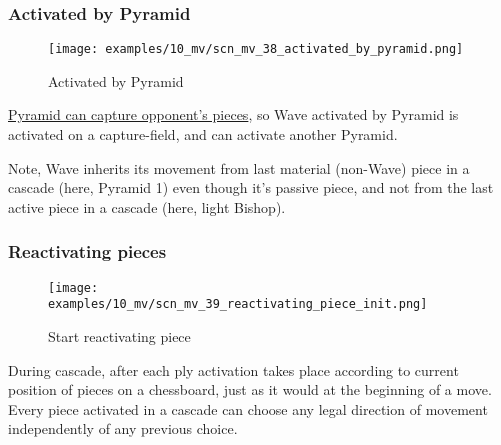 \subsubsection*{Activated by Pyramid}
\label{sec:Miranda's veil/Wave/Cascading Waves/Activated by Pyramid}

\vspace*{-1.4\baselineskip}
\noindent
\begin{figure}[!h]
\texttt{[image: examples/10\_mv/scn\_mv\_38\_activated\_by\_pyramid.png]}
\vspace*{-1.3\baselineskip}
\caption{Activated by Pyramid}
\label{fig:scn_mv_38_activated_by_pyramid}
\end{figure}

\vspace*{-0.3\baselineskip}
\hyperref[fig:scn_ma_02_pyramid_activated]{Pyramid can capture opponent's pieces},
so Wave activated by Pyramid is activated on a capture-field, and can activate
another Pyramid.

Note, Wave inherits its movement from last material (non-Wave) piece in a cascade
(here, Pyramid 1) even though it's passive piece, and not from the last active
piece in a cascade (here, light Bishop).

\clearpage %

\subsubsection*{Reactivating pieces}
\label{sec:Miranda's veil/Wave/Cascading Waves/Reactivating pieces}

\vspace*{-1.4\baselineskip}
\noindent
\begin{figure}[!h]
\texttt{[image: examples/10\_mv/scn\_mv\_39\_reactivating\_piece\_init.png]}
\caption{Start reactivating piece}
\label{fig:scn_mv_39_reactivating_piece_init}
\end{figure}

During cascade, after each ply activation takes place according to current position
of pieces on a chessboard, just as it would at the beginning of a move. Every piece
activated in a cascade can choose any legal direction of movement independently of
any previous choice.


